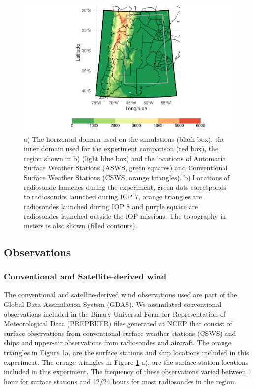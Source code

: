 \documentclass[final,5p,times,twocolumn,authoryear]{elsarticle} %
\begin{document}
\begin{figure}
\includegraphics[width=1\linewidth]{../figures/dominio-1} \caption{a) The horizontal domain used on the simulations (black box), the inner domain used for the experiment comparison (red box), the region shown in b) (light blue box) and the locations of Automatic Surface Weather Stations (ASWS, green squares) and Conventional Surface Weather Stations (CSWS, orange triangles). b) Locations of radiosonde launches during the experiment, green dots corresponds to radiosondes launched during IOP 7, orange triangles are radiosondes launched during IOP 8 and purple square are radiosondes launched outside the IOP missions. The topography in meters is also shown (filled contours).}\label{fig:dominio}
\end{figure}

\hypertarget{observations}{%
\subsection{Observations}\label{observations}}

\hypertarget{conventional-and-satellite-derived-wind}{%
\subsubsection{Conventional and Satellite-derived wind}\label{conventional-and-satellite-derived-wind}}

The conventional and satellite-derived wind observations used are part of the Global Data Assimilation System (GDAS). We assimilated conventional observations included in the Binary Universal Form for Representation of Meteorological Data (PREPBUFR) files generated at NCEP that consist of surface observations from conventional surface weather stations (CSWS) and ships and upper-air observations from radiosondes and aircraft. The orange triangles in Figure \ref{fig:dominio}a, are the surface stations and ship locations included in this experiment. The orange triangles in Figure \ref{fig:dominio} a), are the surface station locations included in this experiment. The frequency of these observations varied between 1 hour for surface stations and 12/24 hours for most radiosondes in the region.
\end{document}
